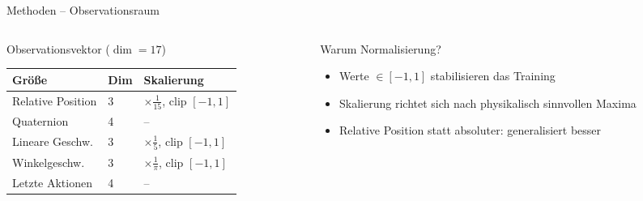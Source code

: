 \begin{frame}{Methoden -- Observationsraum}
\begin{columns}[T]
\begin{column}{0.55\textwidth}
  \begin{block}{Observationsvektor ($\dim = 17$)}
    \renewcommand{\arraystretch}{1.2}
    \begin{tabular}{lll}
      \hline
      \textbf{Größe} & \textbf{Dim} & \textbf{Skalierung} \\
      \hline
      Relative Position & 3 & $\times \tfrac{1}{15}$, clip $[-1,1]$ \\
      Quaternion        & 4 & -- \\
      Lineare Geschw.   & 3 & $\times \tfrac{1}{5}$, clip $[-1,1]$ \\
      Winkelgeschw.     & 3 & $\times \tfrac{1}{\pi}$, clip $[-1,1]$ \\
      Letzte Aktionen   & 4 & -- \\
      \hline
    \end{tabular}
  \end{block}
\end{column}
\begin{column}{0.42\textwidth}
  \begin{exampleblock}{Warum Normalisierung?}
    \begin{itemize}
      \item Werte $\in [-1, 1]$ stabilisieren das Training
      \item Skalierung richtet sich nach physikalisch sinnvollen Maxima
      \item Relative Position statt absoluter: generalisiert besser
    \end{itemize}
  \end{exampleblock}
\end{column}
\end{columns}
\end{frame}


